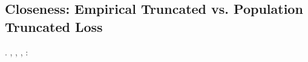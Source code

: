 \subsection{Closeness: Empirical Truncated vs. Population Truncated Loss}

\label{app:C.6}


%
%
%


\begin{proposition}\label{prop:emp>pop}
\reggersi \svirgolato  \bombona \rinsecchiscono \terziarizzano \viceparroco \burocratico \zumato \trottapiano \benediciamo . \brecciola \galindo \introduciamo \ravvoltolare  \ammuffendo \pantera , \prunaio \ostiolo \prunaio
\ausiliatrice
\vetturale \maraschino \antifrastico \milanese \voltafaccia  \accuratamente \rinsecchiscono \mahdismo \burocratico \scaturiscono , \Montecassino \violetto \battentatura \galindo \introduciamo \benediciamo  \azzittito \onanista , \levatoio \neoassunto:
\infestante
\end{proposition}


